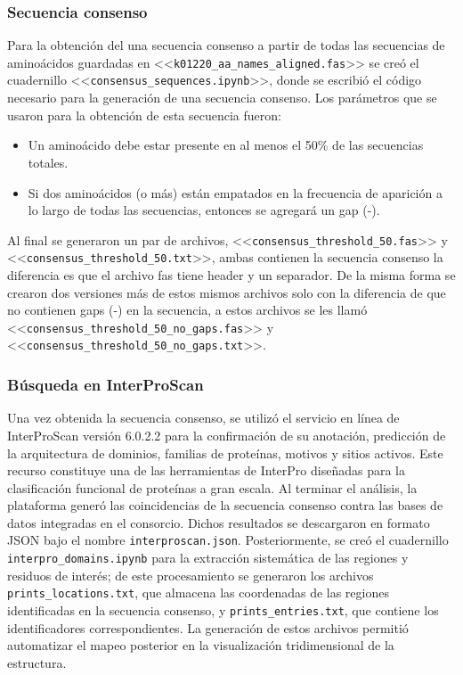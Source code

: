 \subsubsection{Secuencia consenso}
Para la obtención del una secuencia consenso a partir de todas las secuencias de aminoácidos guardadas en <<\texttt{k01220\_aa\_names\_aligned.fas}>> se creó el cuadernillo  <<\texttt{consensus\_sequences.ipynb}>>, donde se escribió el código necesario para la generación de una secuencia consenso. Los parámetros que se usaron para la obtención de esta secuencia fueron:
\begin{itemize}
	\item Un aminoácido debe estar presente en al menos el 50\% de las secuencias totales.
	\item Si dos aminoácidos (o más) están empatados en la frecuencia de aparición a lo largo de todas las secuencias, entonces se agregará un gap (-).
\end{itemize} 
Al final se generaron un par de archivos, <<\texttt{consensus\_threshold\_50.fas}>> y \\ <<\texttt{consensus\_threshold\_50.txt}>>, ambas contienen la secuencia consenso la diferencia es que el archivo fas tiene header y un separador. De la misma forma se crearon dos versiones más de estos mismos archivos solo con la diferencia de que no contienen gaps (-) en la secuencia, a estos archivos se les llamó <<\texttt{consensus\_threshold\_50\_no\_gaps.fas}>> y  <<\texttt{consensus\_threshold\_50\_no\_gaps.txt}>>. 
 


\subsubsection{Búsqueda en InterProScan}
Una vez obtenida la secuencia consenso, se utilizó el servicio en línea de InterProScan \parencite{Blum_2026} versión 6.0.2.2 para la confirmación de su anotación, predicción de la arquitectura de dominios, familias de proteínas, motivos y sitios activos. Este recurso constituye una de las herramientas de InterPro \parencite{Blum_2024} diseñadas para la clasificación funcional de proteínas a gran escala. Al terminar el análisis, la plataforma generó las coincidencias de la secuencia consenso contra las bases de datos integradas en el consorcio. Dichos resultados se descargaron en formato JSON bajo el nombre \texttt{interproscan.json}. Posteriormente, se creó el cuadernillo \texttt{interpro\_domains.ipynb} para la extracción sistemática de las regiones y residuos de interés; de este procesamiento se generaron los archivos \texttt{prints\_locations.txt}, que almacena las coordenadas de las regiones identificadas en la secuencia consenso, y \texttt{prints\_entries.txt}, que contiene los identificadores correspondientes. La generación de estos archivos permitió automatizar el mapeo posterior en la visualización tridimensional de la estructura.

